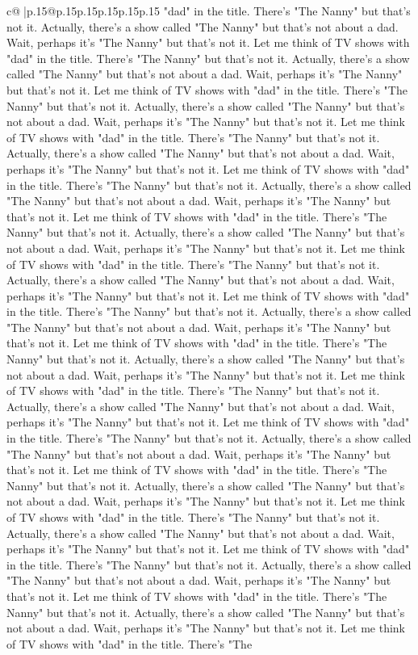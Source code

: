 \documentclass{article}
\begin{document}
{\begin{supertabular}{c@{$\;$}|p{.15\linewidth}@{}p{.15\linewidth}p{.15\linewidth}p{.15\linewidth}p{.15\linewidth}p{.15\linewidth}}
{{{"dad" in the title. There's "The Nanny" but that's not it. Actually, there's a show called "The Nanny" but that's not about a dad. Wait, perhaps it's "The Nanny" but that's not it. Let me think of TV shows with "dad" in the title. There's "The Nanny" but that's not it. Actually, there's a show called "The Nanny" but that's not about a dad. Wait, perhaps it's "The Nanny" but that's not it. Let me think of TV shows with "dad" in the title. There's "The Nanny" but that's not it. Actually, there's a show called "The Nanny" but that's not about a dad. Wait, perhaps it's "The Nanny" but that's not it. Let me think of TV shows with "dad" in the title. There's "The Nanny" but that's not it. Actually, there's a show called "The Nanny" but that's not about a dad. Wait, perhaps it's "The Nanny" but that's not it. Let me think of TV shows with "dad" in the title. There's "The Nanny" but that's not it. Actually, there's a show called "The Nanny" but that's not about a dad. Wait, perhaps it's "The Nanny" but that's not it. Let me think of TV shows with "dad" in the title. There's "The Nanny" but that's not it. Actually, there's a show called "The Nanny" but that's not about a dad. Wait, perhaps it's "The Nanny" but that's not it. Let me think of TV shows with "dad" in the title. There's "The Nanny" but that's not it. Actually, there's a show called "The Nanny" but that's not about a dad. Wait, perhaps it's "The Nanny" but that's not it. Let me think of TV shows with "dad" in the title. There's "The Nanny" but that's not it. Actually, there's a show called "The Nanny" but that's not about a dad. Wait, perhaps it's "The Nanny" but that's not it. Let me think of TV shows with "dad" in the title. There's "The Nanny" but that's not it. Actually, there's a show called "The Nanny" but that's not about a dad. Wait, perhaps it's "The Nanny" but that's not it. Let me think of TV shows with "dad" in the title. There's "The Nanny" but that's not it. Actually, there's a show called "The Nanny" but that's not about a dad. Wait, perhaps it's "The Nanny" but that's not it. Let me think of TV shows with "dad" in the title. There's "The Nanny" but that's not it. Actually, there's a show called "The Nanny" but that's not about a dad. Wait, perhaps it's "The Nanny" but that's not it. Let me think of TV shows with "dad" in the title. There's "The Nanny" but that's not it. Actually, there's a show called "The Nanny" but that's not about a dad. Wait, perhaps it's "The Nanny" but that's not it. Let me think of TV shows with "dad" in the title. There's "The Nanny" but that's not it. Actually, there's a show called "The Nanny" but that's not about a dad. Wait, perhaps it's "The Nanny" but that's not it. Let me think of TV shows with "dad" in the title. There's "The Nanny" but that's not it. Actually, there's a show called "The Nanny" but that's not about a dad. Wait, perhaps it's "The Nanny" but that's not it. Let me think of TV shows with "dad" in the title. There's "The Nanny" but that's not it. Actually, there's a show called "The Nanny" but that's not about a dad. Wait, perhaps it's "The Nanny" but that's not it. Let me think of TV shows with "dad" in the title. There's "The }}}
\end{supertabular}}
\end{document}
